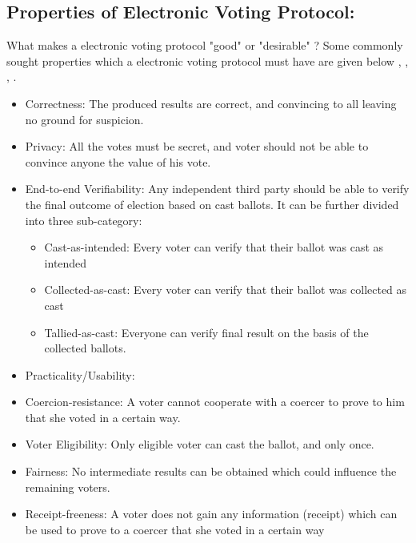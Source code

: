 \subsection{Properties of Electronic Voting Protocol:} 
 What makes a electronic voting protocol  "good" or "desirable" ?  Some commonly sought 
 properties which a electronic voting protocol must have are given below \citep{5958051}, 
 \citep{Benaloh:1994:RSE:195058.195407},  \citep{Delaune:2010:VPT}, \citep{Bernhard:2017:PES}.
 \begin{itemize}
 
  \item Correctness:
 	The produced results are correct, and convincing to all leaving no  ground for suspicion. 
 	
 \item Privacy:
    All the votes must be secret, and voter should not be able to convince anyone the 
    value of his vote.
 
 \item End-to-end Verifiability:
 Any independent third party should be able to verify the final outcome of election based on cast 
 ballots.  It can be further divided into three sub-category:
 
 \begin{itemize}
  \item Cast-as-intended: Every voter can verify that their ballot was cast as
  intended
  \item Collected-as-cast: Every voter can verify that their ballot was collected as
  cast
  \item Tallied-as-cast: Everyone can verify final result on the basis of the
  collected ballots.
\end{itemize}

\item Practicality/Usability: 
  
\item Coercion-resistance:
	A voter cannot cooperate with a coercer to prove to him that she voted in a certain way.
  
\item Voter Eligibility:
  Only eligible voter can cast the ballot, and only once.

\item Fairness:
  No intermediate results can be obtained which could influence the remaining voters.

\item Receipt-freeness:
A voter does not gain any information (receipt) which can be used to prove to a coercer that
she voted in a certain way

 \end{itemize}
 
